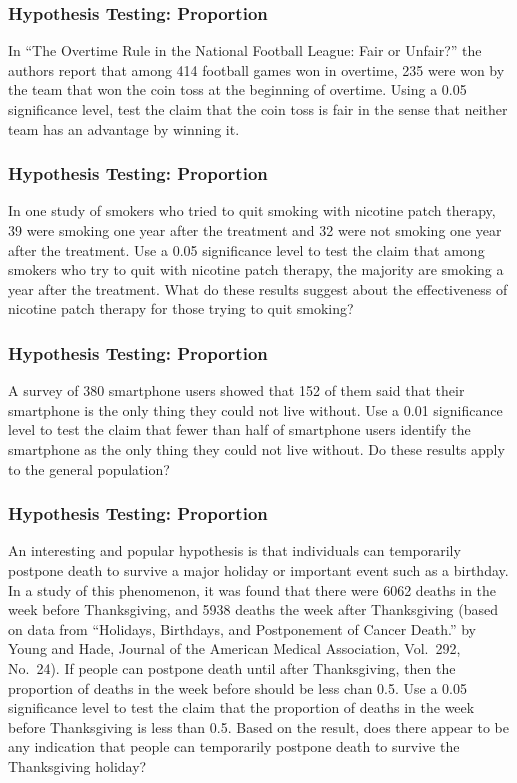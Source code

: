 \documentclass[xcolor=dvipsnames]{beamer}
\begin{document}
\begin{frame}
  \frametitle{Hypothesis Testing: Proportion}
  {\ubung} In ``The Overtime Rule in the National Football League:
  Fair or Unfair?'' the authors report that among 414 football games
  won in overtime, 235 were won by the team that won the coin toss at
  the beginning of overtime. Using a 0.05 significance level, test the
  claim that the coin toss is fair in the sense that neither team has
  an advantage by winning it.
\end{frame}

\begin{frame}
  \frametitle{Hypothesis Testing: Proportion}
  {\ubung} In one study of smokers who tried to quit smoking with
  nicotine patch therapy, 39 were smoking one year after the treatment
  and 32 were not smoking one year after the treatment. Use a 0.05
  significance level to test the claim that among smokers who try to
  quit with nicotine patch therapy, the majority are smoking a year
  after the treatment. What do these results suggest about the
  effectiveness of nicotine patch therapy for those trying to quit
  smoking?
\end{frame}

\begin{frame}
  \frametitle{Hypothesis Testing: Proportion}
  {\ubung} A survey of 380 smartphone users showed that 152 of them
  said that their smartphone is the only thing they could not live
  without. Use a 0.01 significance level to test the claim that fewer
  than half of smartphone users identify the smartphone as the only
  thing they could not live without. Do these results apply to the
  general population?
\end{frame}

\begin{frame}
  \frametitle{Hypothesis Testing: Proportion}
  {\ubung} An interesting and popular hypothesis is that individuals
  can temporarily postpone death to survive a major holiday or
  important event such as a birthday. In a study of this phenomenon,
  it was found that there were 6062 deaths in the week before
  Thanksgiving, and 5938 deaths the week after Thanksgiving (based on
  data from ``Holidays, Birthdays, and Postponement of Cancer Death.''
  by Young and Hade, Journal of the American Medical Association,
  Vol.\ 292, No.\ 24). If people can postpone death until after
  Thanksgiving, then the proportion of deaths in the week before
  should be less chan 0.5. Use a 0.05 significance level to test the
  claim that the proportion of deaths in the week before Thanksgiving
  is less than 0.5. Based on the result, does there appear to be any
  indication that people can temporarily postpone death to survive the
  Thanksgiving holiday?
\end{frame}
\end{document}
